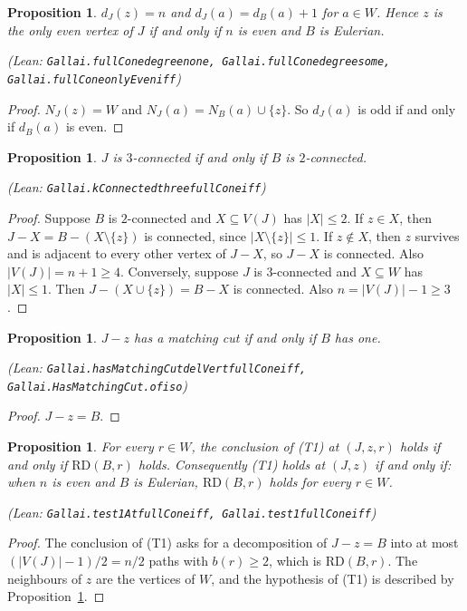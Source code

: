\documentclass[11pt]{amsart}
\newtheorem{proposition}[theorem]{Proposition}
\theoremstyle{definition}
\theoremstyle{remark}
\renewcommand{\_}{\oldunderscore\allowbreak}
\newcommand{\leanst}[1]{\par{\raggedright\small\textup{(Lean: \texttt{#1})}\par}}
\begin{document}
\begin{proposition}\label{prop:cone-par}
$d_J(z)=n$ and $d_J(a)=d_B(a)+1$ for $a\in W$. Hence $z$ is the only even vertex of $J$ if and only
if $n$ is even and $B$ is Eulerian.
\leanst{Gallai.fullCone\_degree\_none, Gallai.fullCone\_degree\_some, Gallai.fullCone\_onlyEven\_iff}
\end{proposition}

\begin{proof}
$N_J(z)=W$ and $N_J(a)=N_B(a)\cup\{z\}$. So $d_J(a)$ is odd if and only if $d_B(a)$ is even.
\end{proof}

\begin{proposition}\label{prop:cone-conn}
$J$ is $3$-connected if and only if $B$ is $2$-connected.
\leanst{Gallai.kConnected\_three\_fullCone\_iff}
\end{proposition}

\begin{proof}
Suppose $B$ is $2$-connected and $X\subseteq V(J)$ has $|X|\le 2$. If $z\in X$, then
$J-X=B-(X\setminus\{z\})$ is connected, since $|X\setminus\{z\}|\le1$. If $z\notin X$, then $z$
survives and is adjacent to every other vertex of $J-X$, so $J-X$ is connected. Also
$|V(J)|=n+1\ge4$. Conversely, suppose $J$ is $3$-connected and $X\subseteq W$ has $|X|\le1$. Then
$J-(X\cup\{z\})=B-X$ is connected. Also $n=|V(J)|-1\ge3$.
\end{proof}

\begin{proposition}\label{prop:cone-mc}
$J-z$ has a matching cut if and only if $B$ has one.
\leanst{Gallai.hasMatchingCut\_delVert\_fullCone\_iff, Gallai.HasMatchingCut.of\_iso}
\end{proposition}

\begin{proof}
$J-z=B$.
\end{proof}

\begin{proposition}\label{prop:cone-t1}
For every $r\in W$, the conclusion of \textup{(T1)} at $(J,z,r)$ holds if and only if
$\mathrm{RD}(B,r)$ holds. Consequently \textup{(T1)} holds at $(J,z)$ if and only if: when $n$ is
even and $B$ is Eulerian, $\mathrm{RD}(B,r)$ holds for every $r\in W$.
\leanst{Gallai.test1At\_fullCone\_iff, Gallai.test1\_fullCone\_iff}
\end{proposition}

\begin{proof}
The conclusion of (T1) asks for a decomposition of $J-z=B$ into at most $(|V(J)|-1)/2=n/2$ paths
with $b(r)\ge2$, which is $\mathrm{RD}(B,r)$. The neighbours of $z$ are the vertices of $W$, and the
hypothesis of (T1) is described by Proposition~\ref{prop:cone-par}.
\end{proof}
\end{document}
